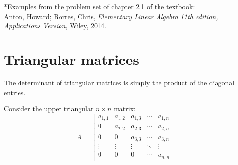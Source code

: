 \documentclass{article}
\begin{document}
\begin{itemize}
\end{itemize}
*Examples from the problem set of chapter 2.1 of the textbook: \\
Anton, Howard; Rorres, Chris, \emph{Elementary Linear Algebra 11th edition, Applications Version}, Wiley, 2014.



\section*{Triangular matrices}

The determinant of triangular matrices is simply the product of the diagonal entries. 


Consider the upper triangular \(n \times n\) matrix:
\[A = \begin{bmatrix} a_{1,1} & a_{1,2} & a_{1,3} & \cdots & a_{1,n} \\ 0 & a_{2,2} & a_{2,3} & \cdots & a_{2,n} \\ 0 & 0 & a_{3,3} & \cdots & a_{3,n} \\ \vdots & \vdots & \vdots & \ddots & \vdots \\ 0 & 0 & 0 & \cdots & a_{n,n} \end{bmatrix}\]
\end{document}
